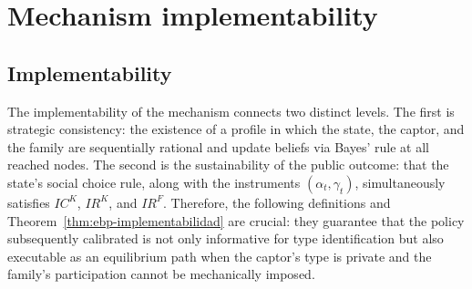 \documentclass[ecta,nameyear,draft]{econsocart}
\theoremstyle{plain}
\theoremstyle{definition}
\newcommand{\1}{\mathbf{1}}
\begin{document}
\section{Mechanism implementability}\label{sec:implementabilidad}

\subsection{Implementability}\label{subsec:implementabilidad}

\noindent The implementability of the mechanism connects two distinct levels. The first is strategic consistency: the existence of a profile in which the state, the captor, and the family are sequentially rational and update beliefs via Bayes' rule at all reached nodes. The second is the sustainability of the public outcome: that the state's social choice rule, along with the instruments $(\alpha_t,\gamma_t)$, simultaneously satisfies $IC^K$, $IR^K$, and $IR^F$. Therefore, the following definitions and Theorem~\ref{thm:ebp-implementabilidad} are crucial: they guarantee that the policy subsequently calibrated is not only informative for type identification but also executable as an equilibrium path when the captor's type is private and the family's participation cannot be mechanically imposed.
\end{document}
